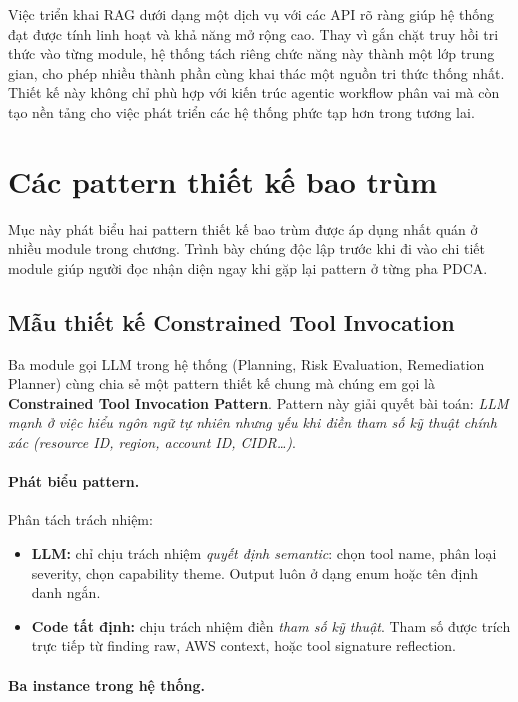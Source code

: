 Việc triển khai RAG dưới dạng một dịch vụ với các API rõ ràng giúp hệ thống đạt được tính linh hoạt và khả năng mở rộng cao. Thay vì gắn chặt truy hồi tri thức vào từng module, hệ thống tách riêng chức năng này thành một lớp trung gian, cho phép nhiều thành phần cùng khai thác một nguồn tri thức thống nhất. Thiết kế này không chỉ phù hợp với kiến trúc agentic workflow phân vai mà còn tạo nền tảng cho việc phát triển các hệ thống phức tạp hơn trong tương lai.


\section{Các pattern thiết kế bao trùm}
\label{sec:design_patterns}

Mục này phát biểu hai pattern thiết kế bao trùm được áp dụng nhất quán ở nhiều module trong chương. Trình bày chúng độc lập trước khi đi vào chi tiết module giúp người đọc nhận diện ngay khi gặp lại pattern ở từng pha PDCA.

\subsection{Mẫu thiết kế Constrained Tool Invocation}
\label{subsec:constrained_tool_pattern}

Ba module gọi LLM trong hệ thống (Planning, Risk Evaluation, Remediation Planner) cùng chia sẻ một pattern thiết kế chung mà chúng em gọi là \textbf{Constrained Tool Invocation Pattern}. Pattern này giải quyết bài toán: \textit{LLM mạnh ở việc hiểu ngôn ngữ tự nhiên nhưng yếu khi điền tham số kỹ thuật chính xác (resource ID, region, account ID, CIDR\ldots)}.

\paragraph*{Phát biểu pattern.} Phân tách trách nhiệm:
\begin{itemize}
  \item \textbf{LLM:} chỉ chịu trách nhiệm \textit{quyết định semantic}: chọn tool name, phân loại severity, chọn capability theme. Output luôn ở dạng enum hoặc tên định danh ngắn.
  \item \textbf{Code tất định:} chịu trách nhiệm điền \textit{tham số kỹ thuật}. Tham số được trích trực tiếp từ finding raw, AWS context, hoặc tool signature reflection.
\end{itemize}

\paragraph*{Ba instance trong hệ thống.}

